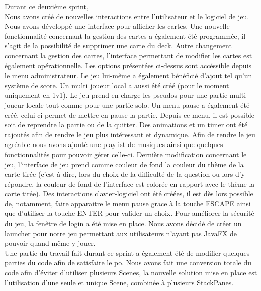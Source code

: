 Durant ce deuxième sprint,\\
Nous avons créé de nouvelles interactions entre l'utilisateur et le logiciel de jeu.
Nous avons développé une interface pour afficher les cartes.
Une nouvelle fonctionnalité concernant la gestion des cartes a également été programmée, il s'agit de la possibilité de supprimer une carte du deck.
Autre changement concernant la gestion des cartes, l'interface permettant de modifier les cartes est également opérationnelle.
Les options présentées ci-dessus sont accéssible depuis le menu administrateur.
Le jeu lui-même a également bénéficié d'ajout tel qu'un système de score.
Un multi joueur local a aussi été créé (pour le moment uniquement en 1v1).
Le jeu prend en charge les pseudos pour une partie multi joueur locale tout comme pour une partie solo.
Un menu pause a également été créé, celui-ci permet de mettre en pause la partie.
Depuis ce menu, il est possible soit de reprendre la partie ou de la quitter.
Des animations et un timer ont été rajoutés afin de rendre le jeu plus intéressant et dynamique.
Afin de rendre le jeu agréable nous avons ajouté une playlist de musiques ainsi que quelques fonctionnalités pour pouvoir gérer celle-ci.
Dernière modification concernant le jeu, l'interface de jeu prend comme couleur de fond la couleur du thème de la carte tirée (c'est à dire, lors du choix de la difficulté de la question ou lors d'y répondre, la couleur de fond de l'interface est colorée en rapport avec le thème la carte tirée).
Des interactions clavier-logiciel ont été créées, il est dès lors possible de, notamment, faire apparaitre le menu pause grace à la touche ESCAPE ainsi que d'utiliser la touche ENTER pour valider un choix.
Pour améliorer la sécurité du jeu, la fenêtre de login a été mise en place.
Nous avons décidé de créer un launcher pour notre jeu permettant aux utilisateurs n'ayant pas JavaFX de pouvoir quand même y jouer.\\
Une partie du travail fait durant ce sprint a également été de modifier quelques parties du code afin de satisfaire le \acrshort{po}.
Nous avons fait une conversion totale du code afin d'éviter d'utiliser plusieurs Scenes, la nouvelle solution mise en place est l'utilisation d'une seule et unique Scene, combinée à plusieurs StackPanes.  
